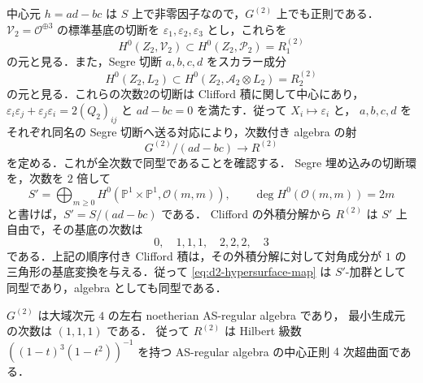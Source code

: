 中心元 $h=ad-bc$ は $S$ 上で非零因子なので，$G^{(2)}$ 上でも正則である．
$\mathcal V_2=\mathcal O^{\oplus3}$ の標準基底の切断を
$\varepsilon_1,\varepsilon_2,\varepsilon_3$ とし，これらを
\[
 H^0(Z_2,\mathcal V_2)\subset H^0(Z_2,\mathcal P_2)=R^{(2)}_1
\]
の元と見る．また，Segre 切断 $a,b,c,d$ をスカラー成分
\[
 H^0(Z_2,L_2)\subset H^0(Z_2,\mathcal A_2\otimes L_2)=R^{(2)}_2
\]
の元と見る．これらの次数2の切断は Clifford 積に関して中心にあり，
$\varepsilon_i\varepsilon_j+\varepsilon_j\varepsilon_i=2(Q_2)_{ij}$ と
$ad-bc=0$ を満たす．従って $X_i\mapsto\varepsilon_i$ と，
$a,b,c,d$ をそれぞれ同名の Segre 切断へ送る対応により，次数付き algebra の射
\begin{equation}
 G^{(2)}/(ad-bc)\longrightarrow R^{(2)}
 \label{eq:d2-hypersurface-map}
\end{equation}
を定める．これが全次数で同型であることを確認する．
Segre 埋め込みの切断環を，次数を $2$ 倍して
\[
 S'=\bigoplus_{m\geq0}H^0(\mathbb P^1\times\mathbb P^1,
 \mathcal O(m,m)),\qquad \deg H^0(\mathcal O(m,m))=2m
\]
と書けば，$S'=S/(ad-bc)$ である．
Clifford の外積分解から $R^{(2)}$ は $S'$ 上自由で，その基底の次数は
\[
 0,\quad 1,1,1,\quad 2,2,2,\quad 3
\]
である．上記の順序付き Clifford 積は，その外積分解に対して対角成分が $1$ の
三角形の基底変換を与える．従って \eqref{eq:d2-hypersurface-map} は $S'$-加群として
同型であり，algebra としても同型である．

\begin{proposition}
$G^{(2)}$ は大域次元 $4$ の左右 noetherian AS-regular algebra であり，
最小生成元の次数は $(1,1,1)$ である．
従って $R^{(2)}$ は Hilbert 級数
$((1-t)^3(1-t^2))^{-1}$ を持つ AS-regular algebra の中心正則 $4$ 次超曲面である．
\end{proposition}

